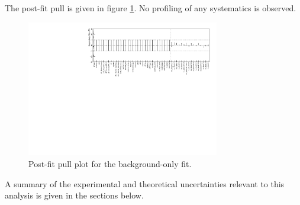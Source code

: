 \indent The post-fit pull is given in figure \ref{figure.pullPlot}.  No profiling of any systematics is observed. \\

\begin{figure}[htbp]
	\begin{center}
		\includegraphics[width=0.75\textwidth, angle=90]{HistFitterStuff/pullPlot.pdf}
		\caption{Post-fit pull plot for the background-only fit.}
		\label{figure.pullPlot}
	\end{center}
\end{figure}

\indent A summary of the experimental and theoretical uncertainties relevant to this analysis is given in the sections below. \\



